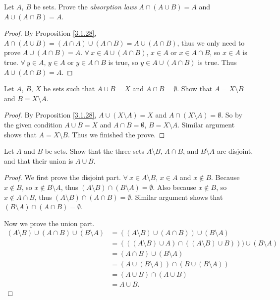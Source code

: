 \begin{exercise}\label{ex 3.1.8}
Let \(A\), \(B\) be sets.
Prove the \emph{absorption laws} \(A \cap (A \cup B) = A\) and \(A \cup (A \cap B) = A\).
\end{exercise}

\begin{proof}
By Proposition \ref{3.1.28}, \(A \cap (A \cup B) = (A \cap A) \cup (A \cap B) = A \cup (A \cap B)\), thus we only need to prove \(A \cup (A \cap B) = A\).
\(\forall\ x \in A \cup (A \cap B)\), \(x \in A\) or \(x \in A \cap B\), so \(x \in A\) is true.
\(\forall\ y \in A\), \(y \in A\) or \(y \in A \cap B\) is true, so \(y \in A \cup (A \cap B)\) is true.
Thus \(A \cup (A \cap B) = A\).
\end{proof}

\begin{exercise}\label{ex 3.1.9}
Let \(A\), \(B\), \(X\) be sets such that \(A \cup B = X\) and \(A \cap B = \emptyset\).
Show that \(A = X \setminus B\) and \(B = X \setminus A\).
\end{exercise}

\begin{proof}
By Proposition \ref{3.1.28}, \(A \cup (X \setminus A) = X\) and \(A \cap (X \setminus A) = \emptyset\).
So by the given condition \(A \cup B = X\) and \(A \cap B = \emptyset\), \(B = X \setminus A\).
Similar argument shows that \(A = X \setminus B\).
Thus we finished the prove.
\end{proof}

\begin{exercise}\label{ex 3.1.10}
Let \(A\) and \(B\) be sets.
Show that the three sets \(A \setminus B\), \(A \cap B\), and \(B \setminus A\) are disjoint, and that their union is \(A \cup B\).
\end{exercise}

\begin{proof}
We first prove the disjoint part.
\(\forall\ x \in A \setminus B\), \(x \in A\) and \(x \notin B\).
Because \(x \notin B\), so \(x \notin B \setminus A\), thus \((A \setminus B) \cap (B \setminus A) = \emptyset\).
Also because \(x \notin B\), so \(x \notin A \cap B\), thus \((A \setminus B) \cap (A \cap B) = \emptyset\).
Similar argument shows that \((B \setminus A) \cap (A \cap B) = \emptyset\).

Now we prove the union part.
\begin{align*}
    (A \setminus B) \cup (A \cap B) \cup (B \setminus A)
    &= ((A \setminus B) \cup (A \cap B)) \cup (B \setminus A) \\
    &= (((A \setminus B) \cup A) \cap ((A \setminus B) \cup B))) \cup (B \setminus A) \\
    &= (A \cap B) \cup (B \setminus A) \\
    &= (A \cup (B \setminus A)) \cap (B \cup (B \setminus A)) \\
    &= (A \cup B) \cap (A \cup B) \\
    &= A \cup B.
\end{align*}
\end{proof}

